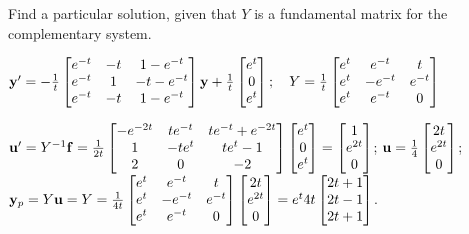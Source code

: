 \documentclass{ximera}
\begin{document}
 \begin{problem}\label{exer:10.7.20}
 Find a particular solution, given that $Y$ is a fundamental matrix for the complementary system.
 
$ {\bf y}'=-\frac{1}{t}\begin{bmatrix}e^{-t}&-t&1-e^{-t}\\e^{-t}&1&-t-e^{-t}\\e^{-t}&-t
&1-e^{-t}\end{bmatrix}{\bf
y}
+\frac{1}{t}\begin{bmatrix}
e^t\\0 \\e^t \end{bmatrix};  \quad Y=\frac{1}{t}\begin{bmatrix} e^t&e^{-t}&t\\e^t&-e^{-t}&e^{-t}\\e^t&e^{-t}&0
\end{bmatrix}$

\begin{solution}
    ${\bf u}'=Y^{-1}{\bf f}=
\frac{1}{2t}\begin{bmatrix}
-e^{-2t}&te^{-t}&te^{-t}+e^{-2t}\\1&-te^t&te^t-1\\
2&0&-2\end{bmatrix}
\begin{bmatrix}e^t\\0\\e^t\end{bmatrix}=
\begin{bmatrix}1\\e^{2t}\\0\end{bmatrix}$;
${\bf u}=
\frac{1}{4}\begin{bmatrix}
2t\\e^{2t}\\0\end{bmatrix}$;
${\bf y}_p=Y{\bf u}=
Y=\frac{1}{4t}\begin{bmatrix}e^t&e^{-t}&t\\
e^t&-e^{-t}&e^{-t}\\e^t&e^{-t}&0\end{bmatrix}
\begin{bmatrix}2t\\e^{2t}\\0\end{bmatrix}=
{e^{t}}{4t}\begin{bmatrix}
2t+1\\2t-1\\2t+1\end{bmatrix}$.
\end{solution}
\end{problem}
\end{document}

